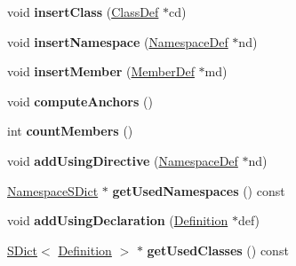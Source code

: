 \begin{DoxyCompactItemize}
\item 
\hypertarget{class_namespace_def_abdd378f66d1535111afbe9ab9dd17bec}{void {\bfseries insert\-Class} (\hyperlink{class_class_def}{Class\-Def} $\ast$cd)}\label{class_namespace_def_abdd378f66d1535111afbe9ab9dd17bec}

\item 
\hypertarget{class_namespace_def_a778cb0bbf18f1e3b863cf9509d9b4987}{void {\bfseries insert\-Namespace} (\hyperlink{class_namespace_def}{Namespace\-Def} $\ast$nd)}\label{class_namespace_def_a778cb0bbf18f1e3b863cf9509d9b4987}

\item 
\hypertarget{class_namespace_def_a107a8239a6007765234a4f336ae11bbd}{void {\bfseries insert\-Member} (\hyperlink{class_member_def}{Member\-Def} $\ast$md)}\label{class_namespace_def_a107a8239a6007765234a4f336ae11bbd}

\item 
\hypertarget{class_namespace_def_a6bd971b93180dba29a797a5472362d17}{void {\bfseries compute\-Anchors} ()}\label{class_namespace_def_a6bd971b93180dba29a797a5472362d17}

\item 
\hypertarget{class_namespace_def_ae44cc0e1f5ef3536d89c2ee1bac7fe2d}{int {\bfseries count\-Members} ()}\label{class_namespace_def_ae44cc0e1f5ef3536d89c2ee1bac7fe2d}

\item 
\hypertarget{class_namespace_def_af8ebd51a7679e1ac3649bbb72f629f34}{void {\bfseries add\-Using\-Directive} (\hyperlink{class_namespace_def}{Namespace\-Def} $\ast$nd)}\label{class_namespace_def_af8ebd51a7679e1ac3649bbb72f629f34}

\item 
\hypertarget{class_namespace_def_a0ba0265415127e99dc450025df698d6c}{\hyperlink{class_namespace_s_dict}{Namespace\-S\-Dict} $\ast$ {\bfseries get\-Used\-Namespaces} () const }\label{class_namespace_def_a0ba0265415127e99dc450025df698d6c}

\item 
\hypertarget{class_namespace_def_a050db52ff34cd330ec6d84f62eae5b04}{void {\bfseries add\-Using\-Declaration} (\hyperlink{class_definition}{Definition} $\ast$def)}\label{class_namespace_def_a050db52ff34cd330ec6d84f62eae5b04}

\item 
\hypertarget{class_namespace_def_aa1d1137c64e631b590cbe235e2962144}{\hyperlink{class_s_dict}{S\-Dict}$<$ \hyperlink{class_definition}{Definition} $>$ $\ast$ {\bfseries get\-Used\-Classes} () const }\label{class_namespace_def_aa1d1137c64e631b590cbe235e2962144}


\end{DoxyCompactItemize}
